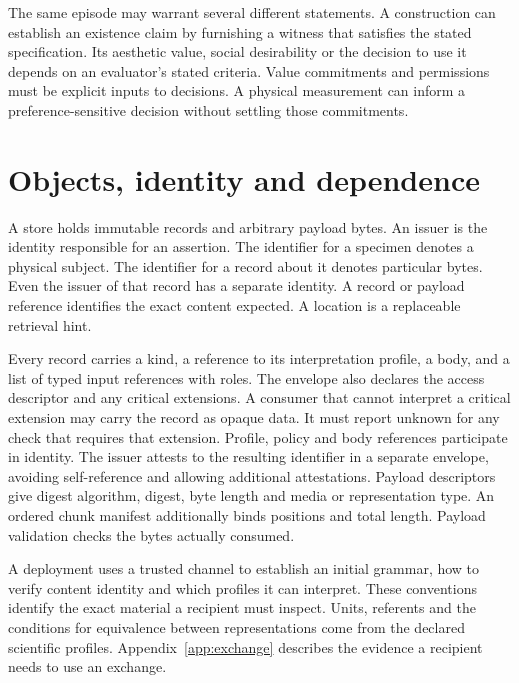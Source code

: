 \documentclass[11pt,a4paper]{article}
\newcommand{\partpage}[1]{\clearpage\section{#1}}
\newcommand{\topic}[1]{\par\smallskip{\sffamily\bfseries\color{ink}#1\par}\nobreak}
\begin{document}
The same episode may warrant several different statements. A construction can establish an existence claim by furnishing a witness that satisfies the stated specification. Its aesthetic value, social desirability or the decision to use it depends on an evaluator's stated criteria. Value commitments and permissions must be explicit inputs to decisions. A physical measurement can inform a preference-sensitive decision without settling those commitments.

\partpage{Objects, identity and dependence}
A store holds immutable records and arbitrary payload bytes. An issuer is the identity responsible for an assertion. The identifier for a specimen denotes a physical subject. The identifier for a record about it denotes particular bytes. Even the issuer of that record has a separate identity. A record or payload reference identifies the exact content expected. A location is a replaceable retrieval hint.

\topic{Envelope}
Every record carries a kind, a reference to its interpretation profile, a body, and a list of typed input references with roles. The envelope also declares the access descriptor and any critical extensions. A consumer that cannot interpret a critical extension may carry the record as opaque data. It must report unknown for any check that requires that extension. Profile, policy and body references participate in identity. The issuer attests to the resulting identifier in a separate envelope, avoiding self-reference and allowing additional attestations. Payload descriptors give digest algorithm, digest, byte length and media or representation type. An ordered chunk manifest additionally binds positions and total length. Payload validation checks the bytes actually consumed.

A deployment uses a trusted channel to establish an initial grammar, how to verify content identity and which profiles it can interpret. These conventions identify the exact material a recipient must inspect. Units, referents and the conditions for equivalence between representations come from the declared scientific profiles. Appendix~\ref{app:exchange} describes the evidence a recipient needs to use an exchange.
\end{document}
